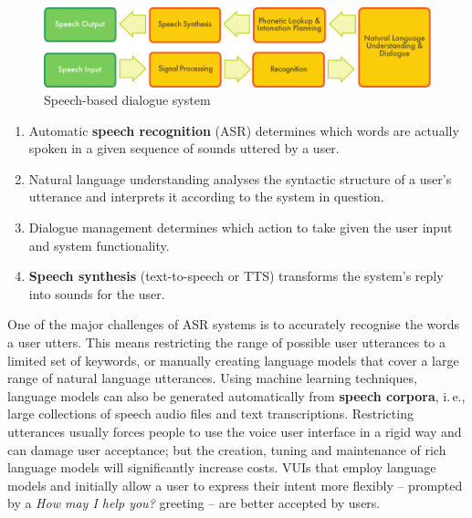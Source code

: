\begin{multicols}{2}
  \begin{figure}[htb]
    \center
    \includegraphics[width=\textwidth]{../_media/english/simple_speech-based_dialogue_architecture}
    \caption{Speech-based dialogue system}
    \label{fig:dialoguearch_en}
  \end{figure}

  \begin{enumerate}
  \item Automatic \textbf{speech recognition} (ASR) determines which words are actually spoken in a given sequence of sounds uttered by a user.  
  \item Natural language understanding analyses the syntactic structure of a user’s utterance and interprets it according to the system in question.
  \item Dialogue management determines which action to take given the user input and system functionality.   
  \item \textbf{Speech synthesis} (text-to-speech or TTS) transforms the system’s reply into sounds for the user.
  \end{enumerate}

  One of the major challenges of ASR systems is to accurately recognise the words a user utters. This means restricting the range of possible user utterances to a limited set of keywords, or manually creating language models that cover a large range of natural language utterances. Using machine learning techniques, language models can also be generated automatically from \textbf{speech corpora}, i.\,e., large collections of speech audio files and text transcriptions. Restricting utterances usually forces people to use the voice user interface in a rigid way and can damage user acceptance; but the creation, tuning and maintenance of rich language models will significantly increase costs. VUIs that employ language models and initially allow a user to express their intent more flexibly -- prompted by a \textit{How may I help you?} greeting -- are better accepted by users.



\end{multicols}
